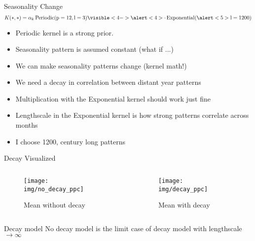 \documentclass{beamer}
\begin{document}
\begin{frame}{Seasonality Change}
    \begin{equation*}
        K(*, *) = \alpha_k \operatorname{Periodic}(\rp=12, \rl=3)\visible<4->{\alert<4>{\cdot \operatorname{Exponential}(\alert<5>{\rl=1200})}}
    \end{equation*}
    \begin{itemize}
        \item Periodic kernel is a strong prior.
        \item Seasonality pattern is assumed constant (what if ...)
        \item<2-> We can make seasonality patterns change (kernel math!)
        \item<3-> We need a decay in correlation between distant year patterns
        \item<4-> Multiplication with the Exponential kernel should work just fine
        \item<5-> Lengthscale in the Exponential kernel is how strong patterns correlate across months
        \item<5-> I choose 1200, century long patterns 
    \end{itemize}
\end{frame}
\begin{frame}{Decay Visualized}
    \begin{columns}
    \begin{column}{0.5\linewidth}
    \begin{figure}
        \centering
        \texttt{[image: img/no\_decay\_ppc]}
        \caption{Mean without decay}
    \end{figure}
    \end{column}
    \begin{column}{0.5\linewidth}
    \begin{figure}
        \centering
        \texttt{[image: img/decay\_ppc]}
        \caption{Mean with decay}
    \end{figure}
    \end{column}
    \end{columns}
    \begin{block}{Decay model}
    No decay model is the limit case of decay model with lengthscale $\to \infty$
    \end{block}
\end{frame}
\end{document}
